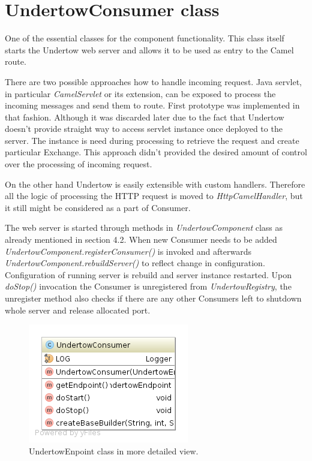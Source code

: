 \documentclass[12pt,final,oneside]{fithesis2}
\begin{document}
\section{UndertowConsumer class}
One of the essential classes for the component functionality. This class itself starts the Undertow web server and allows it to be used as entry to the Camel route. 

There are two possible approaches how to handle incoming request. Java servlet, in particular \textit{CamelServlet} or its extension, can be exposed to process the incoming messages and send them to route. First prototype was implemented in that fashion. Although it was discarded later due to the fact that Undertow doesn't provide straight way to access servlet instance once deployed to the server. The instance is need during processing to retrieve the request and create particular Exchange. This approach didn't provided the desired amount of control over the processing of incoming request.

On the other hand Undertow is easily extensible with custom handlers. Therefore all the logic of processing the HTTP request is moved to \textit{HttpCamelHandler}, but it still might be considered as a part of Consumer.

The web server is started through methods in \textit{UndertowComponent} class as already mentioned in section 4.2. When new Consumer needs to be added \textit{UndertowComponent.registerConsumer()} is invoked and afterwards \textit{UndertowComponent.rebuildServer()} to reflect change in configuration. Configuration of running server is rebuild and server instance restarted. Upon \textit{doStop()} invocation the Consumer is unregistered from \textit{UndertowRegistry}, the unregister method also checks if there are any other Consumers left to shutdown whole server and release allocated port.


\begin{figure}[!h]
\centering
\includegraphics[width=0.5\linewidth]{images/undertowConsumer.png}
\caption{UndertowEnpoint class in more detailed view.}
\end{figure}
\end{document}
